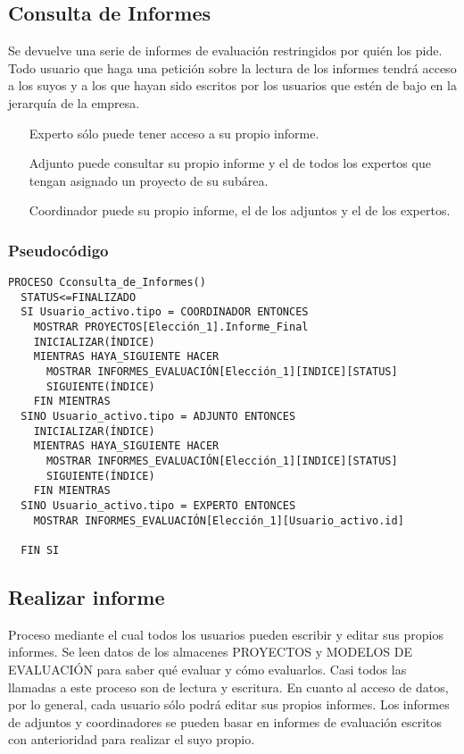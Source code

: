 \documentclass[12pt,a4paper,spanish,twoside]{book}
\begin{document}
\subsection{Consulta de Informes}
Se devuelve una serie de informes de evaluación restringidos por quién los pide.
Todo usuario que haga una petición sobre la lectura de los informes tendrá 
acceso a los suyos y a los que hayan sido escritos por los usuarios que estén de
bajo en la jerarquía de la empresa.
\begin{itemize}
\item[Experto] sólo puede tener acceso a su propio informe.
\item[Adjunto] puede consultar su propio informe y el de todos los expertos que 
tengan asignado un proyecto de su subárea.
\item[Coordinador] puede su propio informe, el de los adjuntos y el de los 
expertos.
\end{itemize}

\subsubsection{Pseudocódigo}
\begin{lstlisting}[inputencoding=utf8/latin1]
PROCESO Cconsulta_de_Informes()
  STATUS<=FINALIZADO
  SI Usuario_activo.tipo = COORDINADOR ENTONCES
    MOSTRAR PROYECTOS[Elección_1].Informe_Final
    INICIALIZAR(ÍNDICE)
    MIENTRAS HAYA_SIGUIENTE HACER
      MOSTRAR INFORMES_EVALUACIÓN[Elección_1][INDICE][STATUS]
      SIGUIENTE(ÍNDICE)
    FIN MIENTRAS
  SINO Usuario_activo.tipo = ADJUNTO ENTONCES
    INICIALIZAR(ÍNDICE)
    MIENTRAS HAYA_SIGUIENTE HACER
      MOSTRAR INFORMES_EVALUACIÓN[Elección_1][INDICE][STATUS]
      SIGUIENTE(ÍNDICE)
    FIN MIENTRAS
  SINO Usuario_activo.tipo = EXPERTO ENTONCES
    MOSTRAR INFORMES_EVALUACIÓN[Elección_1][Usuario_activo.id]

  FIN SI
\end{lstlisting}

\subsection{Realizar informe}
Proceso mediante el cual todos los usuarios pueden escribir y editar sus propios
informes. Se leen datos de los almacenes PROYECTOS y MODELOS DE EVALUACIÓN para 
saber qué evaluar y cómo evaluarlos. Casi todos las llamadas a este proceso son 
de lectura y escritura. En cuanto al acceso de datos, por lo general, cada 
usuario sólo podrá editar sus propios informes. Los informes de adjuntos y 
coordinadores se pueden basar en informes de evaluación escritos con 
anterioridad para realizar el suyo propio.
\end{document}
